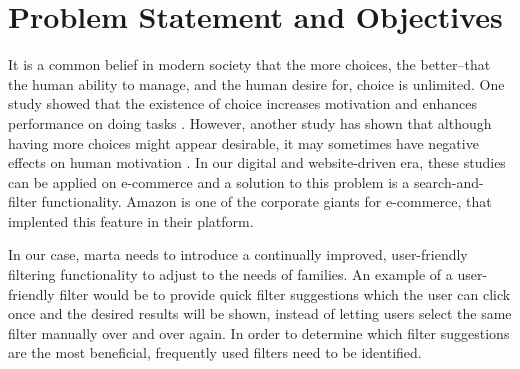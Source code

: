\newpage
\section{Problem Statement and Objectives}

It is a common belief in modern society that the more choices, the better--that the human ability to manage, and the human desire for, choice is unlimited. One study showed that the existence of choice increases motivation and enhances performance on doing tasks \cite{zuckerman1978importance}. However, another study has shown that although having more choices might appear desirable, it may sometimes have negative effects on human motivation \cite{iyengar2000choice}. In our digital and website-driven era, these studies can be applied on e-commerce and a solution to this problem is a search-and-filter functionality. Amazon is one of the corporate giants for e-commerce, that implented this feature in their platform.

In our case, marta needs to introduce a continually improved, user-friendly filtering functionality to adjust to the needs of families. An example of a user-friendly filter would be to provide quick filter suggestions which the user can click once and the desired results will be shown, instead of letting users select the same filter manually over and over again. In order to determine which filter suggestions are the most beneficial, frequently used filters need to be identified.
